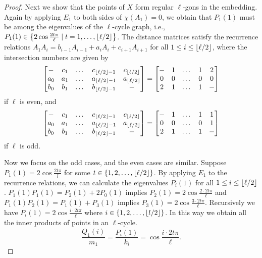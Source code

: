 \documentclass[12pt]{amsart}
\DeclarePairedDelimiter{\set}{\{}{\}}
\DeclarePairedDelimiter{\floor}{\lfloor}{\rfloor}
\begin{document}
\begin{proof}
		Next we show that the points of $X$ form regular $\ell$-gons in the embedding. 
		Again by applying $E_1$ to both sides of  $\chi(A_1) = 0$, we obtain that $P_1(1)$ must be among the eigenvalues of the $\ell$-cycle graph, i.e., $P_1(1) \in \set*{2\cos\frac{2t \pi}{\ell} \mid t = 1, \dots, \floor{\ell/2}}$. 
		The distance matrices satisfy the recurrence relations $A_1 A_i = b_{i-1} A_{i-1} + a_i A_i + c_{i+1} A_{i+1}$ for all $1 \leq i \leq \floor{\ell/2}$, where the intersection numbers are given by
		\[
			\begin{bmatrix}
				- & c_1 & \dots & c_{\floor{\ell/2}-1} & c_{\floor{\ell/2}} \\
				a_0 & a_1 & \dots & a_{\floor{\ell/2}-1} & a_{\floor{\ell/2}} \\
				b_0 & b_1 & \dots & b_{\floor{\ell/2}-1} & - 	
			\end{bmatrix}
			=
			\begin{bmatrix}
				- & 1 & \dots & 1 & 2 \\
				0 & 0 & \dots & 0 & 0 \\
				2 & 1 & \dots & 1 & - 	
			\end{bmatrix}
		\]
		if $\ell$ is even, and
		\[
			\begin{bmatrix}
				- & c_1 & \dots & c_{\floor{\ell/2}-1} & c_{\floor{\ell/2}} \\
				a_0 & a_1 & \dots & a_{\floor{\ell/2}-1} & a_{\floor{\ell/2}} \\
				b_0 & b_1 & \dots & b_{\floor{\ell/2}-1} & - 	
			\end{bmatrix}
			=
			\begin{bmatrix}
				- & 1 & \dots & 1 & 1 \\
				0 & 0 & \dots & 0 & 1 \\
				2 & 1 & \dots & 1 & - 	
			\end{bmatrix}
		\]
		if $\ell$ is odd.

		Now we focus on the odd cases, and the even cases are similar.
		Suppose $P_1(1) = 2\cos\frac{2t \pi}{l}$ for some $t \in \set{1, 2, \dots, \floor{\ell/2}}$. By applying $E_1$ to the recurrence relations, we can calculate the eigenvalues $P_i(1)$ for all $1 \leq i \leq \floor{\ell/2}$. 
		$P_1(1) P_1(1) = P_2(1) + 2 P_0(1)$ implies $P_2(1) = 2\cos\frac{2 \cdot 2t \pi}{\ell}$ and $P_1(1) P_2(1) = P_1(1) + P_3(1)$ implies $P_3(1) = 2\cos\frac{3 \cdot 2t \pi}{\ell}$. 
		Recursively we have $P_i(1) = 2\cos\frac{i \cdot 2t \pi}{\ell}$ where $i \in \set{1,2,\dots,\floor{l/2}}$. 
						In this way we obtain all the inner products of points in an $\ell$-cycle.
		\[
			\frac{Q_1(i)}{m_1} = \frac{\overline{P_i(1)}}{k_i} = \cos\frac{i \cdot 2t \pi}{\ell}.
		\]
				

\end{proof}
\end{document}
